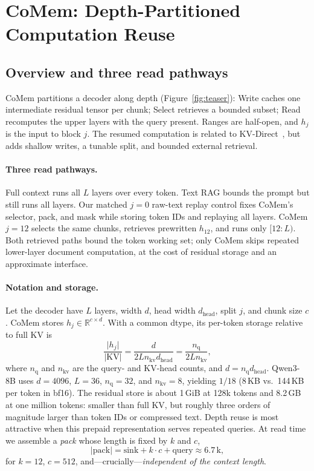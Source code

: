 \section{CoMem: Depth-Partitioned Computation Reuse}
\label{sec:method}

\subsection{Overview and three read pathways}
CoMem partitions a decoder along depth (Figure~\ref{fig:teaser}): Write caches one
intermediate residual tensor per chunk; Select retrieves a bounded subset; Read
recomputes the upper layers with the query present. Ranges are half-open, and
$h_j$ is the input to block $j$. The resumed computation is related to
KV-Direct~\citep{kvdirect}, but adds shallow writes, a tunable split, and bounded
external retrieval.

\paragraph{Three read pathways.} Full context runs all $L$ layers over every
token. Text RAG bounds the prompt but still runs all layers. Our matched
$j{=}0$ raw-text replay control fixes CoMem's selector, pack, and mask while
storing token IDs and replaying all layers. CoMem $j{=}12$ selects the same
chunks, retrieves prewritten $h_{12}$, and runs only $[12{:}L)$. Both retrieved
paths bound the token working set; only CoMem skips repeated lower-layer
document computation, at the cost of residual storage and an approximate
interface.

\paragraph{Notation and storage.} Let the decoder have $L$ layers, width $d$,
head width $d_{\mathrm{head}}$, split $j$, and chunk size $c$. CoMem stores
$h_j\in\mathbb{R}^{c\times d}$. With a common dtype, its per-token storage
relative to full KV is
\begin{equation}
\frac{\lvert h_j\rvert}{\lvert\mathrm{KV}\rvert}
=\frac{d}{2L n_{\mathrm{kv}}d_{\mathrm{head}}}
=\frac{n_{\mathrm{q}}}{2L n_{\mathrm{kv}}},
\label{eq:store}
\end{equation}
where $n_{\mathrm{q}}$ and $n_{\mathrm{kv}}$ are the query- and KV-head counts,
and $d=n_{\mathrm{q}}d_{\mathrm{head}}$.
Qwen3-8B uses $d{=}4096$, $L{=}36$, $n_{\mathrm{q}}{=}32$, and
$n_{\mathrm{kv}}{=}8$, yielding $1/18$ (8\,KB vs.\ 144\,KB per token in bf16).
The residual store is about 1\,GiB at 128k tokens and 8.2\,GB at one million
tokens: smaller than full KV, but roughly three orders of magnitude larger than
token IDs or compressed text. Depth reuse is most attractive when this prepaid
representation serves repeated queries.
At read time we assemble a \emph{pack} whose length is fixed by $k$ and $c$,
\begin{equation}
\lvert\text{pack}\rvert=\text{sink}+k\!\cdot\!c+\text{query}\approx 6.7\,\mathrm{k},
\label{eq:pack}
\end{equation}
for $k{=}12$, $c{=}512$, and---crucially---\emph{independent of the context
length}.

